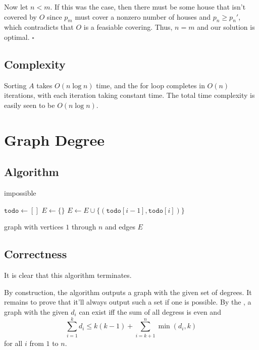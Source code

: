 \documentclass[12pt]{article}
\begin{document}
Now let $n < m$.
If this was the case, then there must be some house that isn't covered by $O$
since $p_m$ must cover a nonzero number of houses and $p_n \ge p_n'$,
which contradicts that $O$ is a feasiable covering.
Thus, $n=m$ and our solution is optimal. $\square$

\subsection{Complexity}

Sorting $A$ takes $O(n \log n)$ time, and the for loop completes in $O(n)$
iterations, with each iteration taking constant time.
The total time complexity is easily seen to be $\boxed{O(n \log n)}$.

\pagebreak

\section{Graph Degree}

\subsection{Algorithm}

\begin{algorithmic}[1]
        \State \Return impossible
    \EndIf

    \item[]
    \State $\texttt{todo} \gets []$
    \State $E \gets \{\}$
        \State $E \gets E \cup \{(\texttt{todo}[i-1], \texttt{todo}[i])\}$
    \EndFor

    \item[]
    \State \Return graph with vertices $1$ through $n$ and edges $E$
\end{algorithmic}

\subsection{Correctness}

It is clear that this algorithm terminates.

By construction, the algorithm outputs a graph with the given set of degrees.
It remains to prove that it'll always output such a set if one is possible.
By the \href{https://en.wikipedia.org/wiki/Erd%C5%91s%E2%80%93Gallai_theorem}{\color{blue}{Erdos-Gallai Theorem}},
a graph with the given $d_i$ can exist iff the sum of all degress is even and
\[\sum_{i=1}^{k} d_i \le k(k-1)+\sum_{i=k+1}^{n} \min(d_i, k)\]
for all $i$ from $1$ to $n$.
\end{document}
